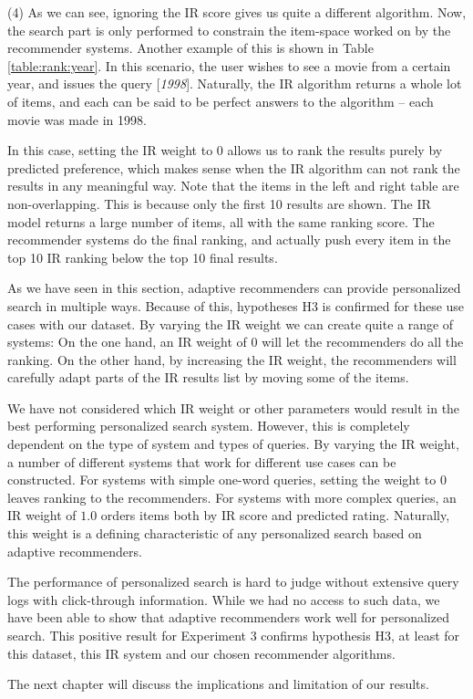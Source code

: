 (4) As we can see, ignoring the IR score gives us quite a different algorithm.
Now, the search part is only performed to constrain the item-space worked
on by the recommender systems.
Another example of this is shown in Table \ref{table:rank:year}.
In this scenario, the user wishes to see a movie from a certain year,
and issues the query [\emph{1998}].
Naturally, the IR algorithm returns a whole lot of items, and each can
be said to be perfect answers to the algorithm -- each movie
was made in 1998.

In this case, setting the IR weight to $0$ allows us to rank the results
purely by predicted preference, which makes sense when the IR algorithm
can not rank the results in any meaningful way.
Note that the items in the left and right table are non-overlapping.
This is because only the first 10 results are shown.
The IR model returns a large number of items,
all with the same ranking score.
The recommender systems do the final ranking, and actually
push every item in the top 10 IR ranking 
below the top 10 final results.



As we have seen in this section, adaptive recommenders can provide personalized search
in multiple ways. 
Because of this, hypotheses H3 is confirmed for these use cases with our dataset.
By varying the IR weight we can create quite a range of systems:
On the one hand, an IR weight of 0 will let the recommenders do all the ranking.
On the other hand, by increasing the IR weight, the recommenders will carefully
adapt parts of the IR results list by moving some of the items.



We have not considered which IR weight or other parameters would result in the best performing
personalized search system.
However, this is completely dependent on the type of system and types of queries.
By varying the IR weight, a number of different systems that work for different use cases
can be constructed. For systems with simple one-word queries, setting the weight
to $0$ leaves ranking to the recommenders.
For systems with more complex queries, an IR weight of $1.0$ 
orders items both by IR score and predicted rating.
Naturally, this weight is a defining characteristic of any 
personalized search based on adaptive recommenders.

The performance of personalized search is hard to judge without
extensive query logs with click-through information.
While we had no access to such data, 
we have been able to show that adaptive recommenders
work well for personalized search.
This positive result for Experiment 3 confirms hypothesis H3,
at least for this dataset, this IR system and our chosen recommender algorithms.

The next chapter will discuss the implications and limitation of our results.

